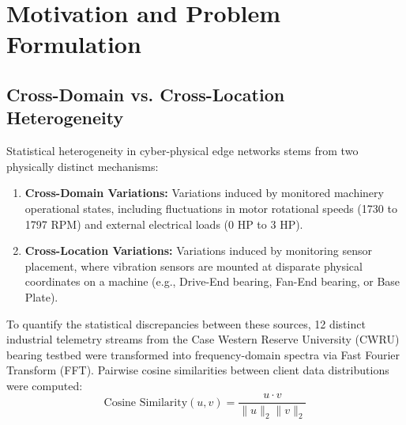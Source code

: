 \documentclass[12pt,a4paper]{report}
\begin{document}
\chapter{Motivation and Problem Formulation}

\section{Cross-Domain vs. Cross-Location Heterogeneity}
Statistical heterogeneity in cyber-physical edge networks stems from two physically distinct mechanisms:
\begin{enumerate}
    \item \textbf{Cross-Domain Variations:} Variations induced by monitored machinery operational states, including fluctuations in motor rotational speeds (1730 to 1797 RPM) and external electrical loads (0 HP to 3 HP).
    \item \textbf{Cross-Location Variations:} Variations induced by monitoring sensor placement, where vibration sensors are mounted at disparate physical coordinates on a machine (e.g., Drive-End bearing, Fan-End bearing, or Base Plate).
\end{enumerate}

To quantify the statistical discrepancies between these sources, 12 distinct industrial telemetry streams from the Case Western Reserve University (CWRU) bearing testbed were transformed into frequency-domain spectra via Fast Fourier Transform (FFT). Pairwise cosine similarities between client data distributions were computed:
\begin{equation}
    \text{Cosine Similarity}(u, v) = \frac{u \cdot v}{\|u\|_2 \|v\|_2}
\end{equation}
\end{document}

